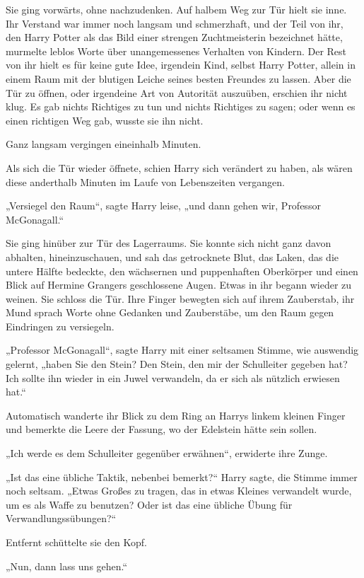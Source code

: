 {Sie ging vorwärts, ohne nachzudenken. Auf halbem Weg zur Tür hielt sie inne. Ihr Verstand war immer noch langsam und schmerzhaft, und der Teil von ihr, den Harry Potter als das Bild einer strengen Zuchtmeisterin bezeichnet hätte, murmelte leblos Worte über unangemessenes Verhalten von Kindern. Der Rest von ihr hielt es für keine gute Idee, irgendein Kind, selbst Harry Potter, allein in einem Raum mit der blutigen Leiche seines besten Freundes zu lassen. Aber die Tür zu öffnen, oder irgendeine Art von Autorität auszuüben, erschien ihr nicht klug. Es gab nichts Richtiges zu tun und nichts Richtiges zu sagen; oder wenn es einen richtigen Weg gab, wusste sie ihn nicht.

Ganz langsam vergingen eineinhalb Minuten.

Als sich die Tür wieder öffnete, schien Harry sich verändert zu haben, als wären diese anderthalb Minuten im Laufe von Lebenszeiten vergangen.

„Versiegel den Raum“, sagte Harry leise, „und dann gehen wir, Professor McGonagall.“

Sie ging hinüber zur Tür des Lagerraums. Sie konnte sich nicht ganz davon abhalten, hineinzuschauen, und sah das getrocknete Blut, das Laken, das die untere Hälfte bedeckte, den wächsernen und puppenhaften Oberkörper und einen Blick auf Hermine Grangers geschlossene Augen. Etwas in ihr begann wieder zu weinen. Sie schloss die Tür. Ihre Finger bewegten sich auf ihrem Zauberstab, ihr Mund sprach Worte ohne Gedanken und Zauberstäbe, um den Raum gegen Eindringen zu versiegeln.

„Professor McGonagall“, sagte Harry mit einer seltsamen Stimme, wie auswendig gelernt, „haben Sie den Stein? Den Stein, den mir der Schulleiter gegeben hat? Ich sollte ihn wieder in ein Juwel verwandeln, da er sich als nützlich erwiesen hat.“

Automatisch wanderte ihr Blick zu dem Ring an Harrys linkem kleinen Finger und bemerkte die Leere der Fassung, wo der Edelstein hätte sein sollen.

„Ich werde es dem Schulleiter gegenüber erwähnen“, erwiderte ihre Zunge.

„Ist das eine übliche Taktik, nebenbei bemerkt?“ Harry sagte, die Stimme immer noch seltsam. „Etwas Großes zu tragen, das in etwas Kleines verwandelt wurde, um es als Waffe zu benutzen? Oder ist das eine übliche Übung für Verwandlungssübungen?“

Entfernt schüttelte sie den Kopf.

„Nun, dann lass uns gehen.“

}
